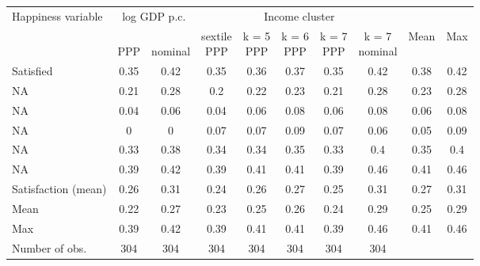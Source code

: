 
\begin{tabular}[t]{lccccccccc}
\toprule Happiness variable & \multicolumn{2}{c}{log GDP p.c.} & \multicolumn{5}{c}{Income cluster} & & \\
  & \makecell{\,\\PPP} & \makecell{\,\\nominal} & \makecell{sextile\\PPP} & \makecell{k = 5\\PPP} & \makecell{k = 6\\PPP} & \makecell{k = 7\\PPP} & \makecell{k = 7\\nominal} & Mean & Max\\
\midrule
Satisfied & 0.35 & 0.42 & 0.35 & 0.36 & 0.37 & 0.35 & 0.42 & 0.38 & 0.42\\
NA & 0.21 & 0.28 & 0.2 & 0.22 & 0.23 & 0.21 & 0.28 & 0.23 & 0.28\\
NA & 0.04 & 0.06 & 0.04 & 0.06 & 0.08 & 0.06 & 0.08 & 0.06 & 0.08\\
NA & 0 & 0 & 0.07 & 0.07 & 0.09 & 0.07 & 0.06 & 0.05 & 0.09\\
NA & 0.33 & 0.38 & 0.34 & 0.34 & 0.35 & 0.33 & 0.4 & 0.35 & 0.4\\
NA & 0.39 & 0.42 & 0.39 & 0.41 & 0.41 & 0.39 & 0.46 & 0.41 & 0.46\\
Satisfaction (mean) & 0.26 & 0.31 & 0.24 & 0.26 & 0.27 & 0.25 & 0.31 & 0.27 & 0.31\\ \midrule 
Mean & 0.22 & 0.27 & 0.23 & 0.25 & 0.26 & 0.24 & 0.29 & 0.25 & 0.29\\
Max & 0.39 & 0.42 & 0.39 & 0.41 & 0.41 & 0.39 & 0.46 & 0.41 & 0.46\\ \midrule 
Number of obs. & 304 & 304 & 304 & 304 & 304 & 304 & 304 &  & \\
\bottomrule
\end{tabular}